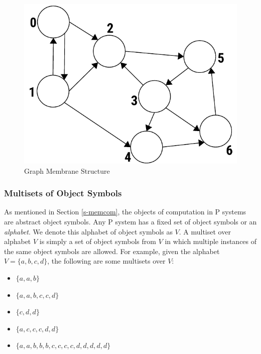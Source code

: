 \documentclass{article}
\begin{document}
\begin{figure}[H]
\begin{center}
\includegraphics[scale=0.60]{figures/zzz-graph-topology.pdf}
\caption{Graph Membrane Structure}
\label{fig:graph-topology}
\end{center}
\end{figure}


\subsubsection{Multisets of Object Symbols}\label{s-multiset}

As mentioned in Section \ref{s-memcom}, the objects of computation in P systems are abstract
object symbols. Any P system has a fixed set of object symbols or an \textit{alphabet}. We denote 
this alphabet of object symbols as $V$. A multiset over alphabet $V$ is simply a set of object 
symbols from $V$ in which multiple instances of the same object symbols are allowed. For example, 
given the alphabet $V = \{a,b,c,d\}$, the following are some multisets over $V$:

\begin{itemize}
\item $\{a,a,b\}$
\item $\{a,a,b,c,c,d\}$
\item $\{c,d,d\}$
\item $\{a,c,c,c,d,d\}$
\item $\{a,a,b,b,b,c,c,c,c,d,d,d,d,d\}$
\end{itemize}
\end{document}
